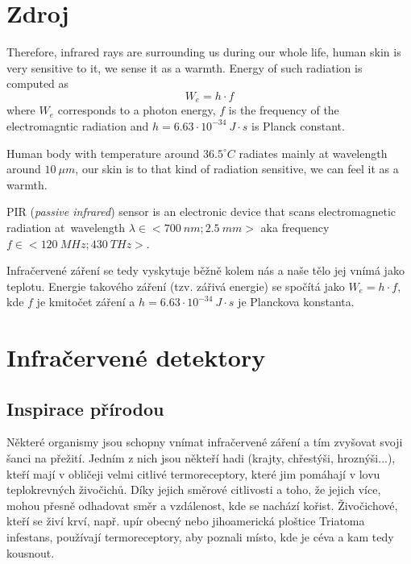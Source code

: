 \documentclass[10pt,a4paper]{article}
\begin{document}
  \section{Zdroj}
  Therefore, infrared rays are surrounding us during our whole life, human skin is very sensitive to it,
  we sense it as a warmth. Energy of such radiation is computed as $$W_e=h\cdot f$$ where $W_e$ corresponds
  to a photon energy, $f$ is the frequency of the electromagntic radiation and $h=6.63\cdot10^{-34}~J\cdot s $
  is Planck constant.



  Human body with temperature around $36.5^\circ C$ radiates mainly at wavelength around $10~\mu m$,
  our skin is to that kind of radiation sensitive, we can feel it as a warmth.


  
  PIR ({\it passive infrared}) sensor is an electronic device that scans electromagnetic
  radiation at~wavelength $\lambda\in<700~nm;2.5~mm>$ aka frequency $f\in<120~MHz;430~THz>$.

  

  Infračervené záření se tedy vyskytuje běžně kolem nás a naše tělo jej vnímá jako teplotu. Energie
  takového záření (tzv. zářivá energie) se spočítá jako $W_e=h\cdot f$, kde $f$ je kmitočet záření
  a $h=6.63\cdot10^{-34}~J\cdot s $ je Planckova konstanta. \cite{WikipediaInfrared}

  \section{Infračervené detektory}
  \subsection{Inspirace přírodou}
  Některé organismy jsou schopny vnímat infračervené záření a tím zvyšovat svoji šanci na přežití.
  Jedním z nich jsou někteří hadi (krajty, chřestýši, hroznýši...), kteří mají v obličeji velmi citlivé
  termoreceptory, které jim pomáhají v lovu teplokrevných živočichů. Díky jejich směrové citlivosti
  a toho, že jejich více, mohou přesně odhadovat směr a vzdálenost, kde se nachází kořist. \cite{SnakeInfrared}
  Živočichové, kteří se živí krví, např. upír obecný nebo jihoamerická ploštice Triatoma infestans,
  používají termoreceptory, aby poznali místo, kde je céva a kam tedy kousnout.
\end{document}
